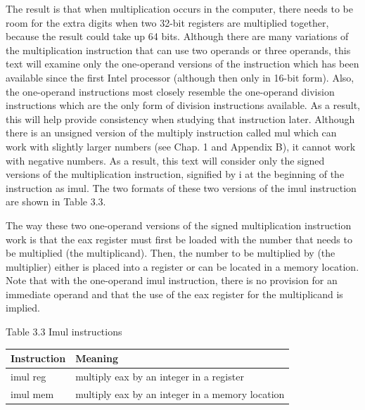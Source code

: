 \documentclass[10pt]{article}
\begin{document}
The result is that when multiplication occurs in the computer, there needs to be room for the extra digits when two 32-bit registers are multiplied together, because the result could take up 64 bits. Although there are many variations of the multiplication instruction that can use two operands or three operands, this text will examine only the one-operand versions of the instruction which has been available since the first Intel processor (although then only in 16-bit form). Also, the one-operand instructions most closely resemble the one-operand division instructions which are the only form of division instructions available. As a result, this will help provide consistency when studying that instruction later. Although there is an unsigned version of the multiply instruction called mul which can work with slightly larger numbers (see Chap. 1 and Appendix B), it cannot work with negative numbers. As a result, this text will consider only the signed versions of the multiplication instruction, signified by i at the beginning of the instruction as imul. The two formats of these two versions of the imul instruction are shown in Table 3.3.

The way these two one-operand versions of the signed multiplication instruction work is that the eax register must first be loaded with the number that needs to be multiplied (the multiplicand). Then, the number to be multiplied by (the multiplier) either is placed into a register or can be located in a memory location. Note that with the one-operand imul instruction, there is no provision for an immediate operand and that the use of the eax register for the multiplicand is implied.

Table 3.3 Imul instructions

\begin{center}
\begin{tabular}{|l|l|}
\hline
Instruction & Meaning \\
\hline
imul reg & multiply eax by an integer in a register \\
\hline
imul mem & multiply eax by an integer in a memory location \\
\hline
\end{tabular}
\end{center}
\end{document}
